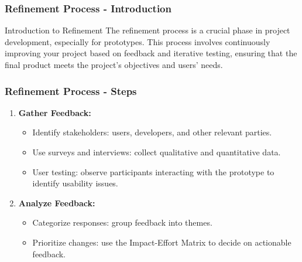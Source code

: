\documentclass[aspectratio=169]{beamer}
\begin{document}
\begin{frame}[fragile]
    \frametitle{Refinement Process - Introduction}
    \begin{block}{Introduction to Refinement}
        The refinement process is a crucial phase in project development, especially for prototypes. This process involves continuously improving your project based on feedback and iterative testing, ensuring that the final product meets the project's objectives and users' needs.
    \end{block}
\end{frame}

\begin{frame}[fragile]
    \frametitle{Refinement Process - Steps}
    \begin{enumerate}
        \item \textbf{Gather Feedback:}
            \begin{itemize}
                \item Identify stakeholders: users, developers, and other relevant parties.
                \item Use surveys and interviews: collect qualitative and quantitative data.
                \item User testing: observe participants interacting with the prototype to identify usability issues.
            \end{itemize}
        \item \textbf{Analyze Feedback:}
            \begin{itemize}
                \item Categorize responses: group feedback into themes.
                \item Prioritize changes: use the Impact-Effort Matrix to decide on actionable feedback.
            \end{itemize}
    \end{enumerate}
\end{frame}
\end{document}
